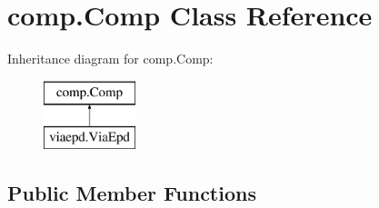 \hypertarget{classcomp_1_1Comp}{}\section{comp.\+Comp Class Reference}
\label{classcomp_1_1Comp}
Inheritance diagram for comp.\+Comp\+:\begin{figure}[H]
\begin{center}
\leavevmode
\includegraphics[height=2.000000cm]{classcomp_1_1Comp}
\end{center}
\end{figure}
\subsection*{Public Member Functions}
